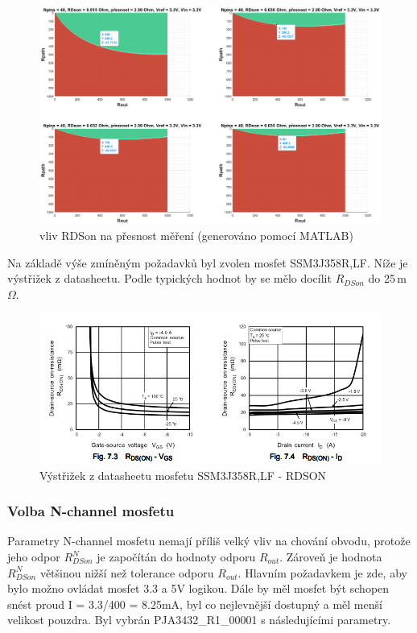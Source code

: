 \begin{figure}[ht!]
    \centering
    \includegraphics[width = 1\textwidth]{obrazky/vliv_RDSON.eps}
    \caption{vliv RDSon na přesnost měření (generováno pomocí MATLAB)}
    \label{fig:vliv RDSon}
\end{figure}

Na základě výše zmíněným požadavků byl zvolen mosfet SSM3J358R,LF. Níže je výstřižek z datasheetu. Podle typických hodnot by se mělo
docílit $R_{DSon}$ do 25\,m$\Omega$.
\begin{figure}[ht!]
    \centering
    \includegraphics[height = 0.15\textheight]{obrazky/mosfet_datasheet.png}
    \caption{Výstřižek z datasheetu mosfetu SSM3J358R,LF - RDSON\cite{PMOS_datasheet}}
    \label{fig:Výstřižek z datasheetu mosfetu SSM3J358R,LF - RDSON}
\end{figure}

\clearpage

\subsubsection{Volba N-channel mosfetu}
Parametry N-channel mosfetu nemají příliš velký vliv na chování obvodu, protože jeho odpor $R^N_{DSon}$ je započítán do hodnoty odporu $R_{out}$.
Zároveň je hodnota $R^N_{DSon}$ většinou nižší než tolerance odporu $R_{out}$. Hlavním požadavkem je zde, aby bylo možno ovládat mosfet 3.3 a 5V logikou.
Dále by měl mosfet být schopen snést proud I = 3.3/400 = 8.25mA, byl co nejlevnější dostupný a měl menší velikost pouzdra. Byl vybrán PJA3432\_R1\_00001
s následujícími parametry.\\

